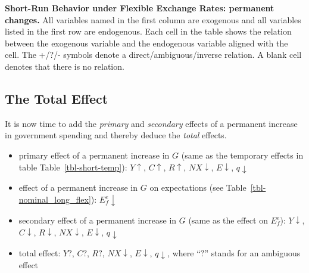 \documentclass[
  letterpaper,
]{book}
\providecommand{\tightlist}{%
  \setlength{\itemsep}{0pt}\setlength{\parskip}{0pt}}\usepackage{longtable,booktabs,array}
\theoremstyle{plain}
\theoremstyle{remark}
\begin{document}
\begin{table}

\caption{\label{tbl-short-perm}\textbf{Short-Run Behavior under Flexible
Exchange Rates: permanent changes.} All variables named in the first
column are exogenous and all variables listed in the first row are
endogenous. Each cell in the table shows the relation between the
exogenous variable and the endogenous variable aligned with the cell.
The +/?/- symbols denote a direct/ambiguous/inverse relation. A blank
cell denotes that there is no relation.}


\end{table}%

\subsection{The Total Effect}\label{sec-fiscal-short-perm-total}

It is now time to add the \emph{primary} and \emph{secondary} effects of
a permanent increase in government spending and thereby deduce the
\emph{total} effects.

\begin{itemize}
\tightlist
\item
  primary effect of a permanent increase in \(G\) (same as the temporary
  effects in table Table~\ref{tbl-short-temp}): \(Y\uparrow\),
  \(C\uparrow\), \(R\uparrow\), \(NX\downarrow\), \(E\downarrow\),
  \(q\downarrow\)
\item
  effect of a permanent increase in \(G\) on expectations (see
  Table~\ref{tbl-nominal_long_flex}): \(E_f^e\downarrow\)
\item
  secondary effect of a permanent increase in \(G\) (same as the effect
  on \(E_f^e\)): \(Y\downarrow\), \(C\downarrow\), \(R\downarrow\),
  \(NX\downarrow\), \(E\downarrow\), \(q\downarrow\)
\item
  total effect: \(Y?\), \(C?\), \(R?\), \(NX\downarrow\),
  \(E\downarrow\), \(q\downarrow\), where ``\(?\)'' stands for an
  ambiguous effect
\end{itemize}
\end{document}
